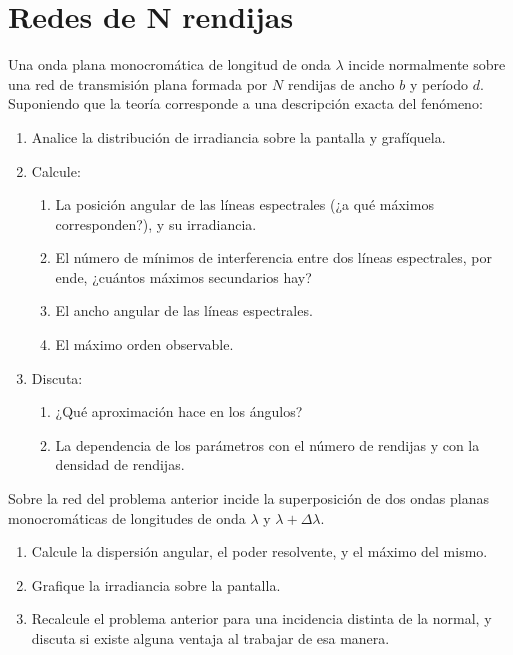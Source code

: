 \section*{Redes de N rendijas}

\item Una onda plana monocromática de longitud de onda $\lambda$ incide normalmente sobre una red de transmisión plana formada por $N$ rendijas de ancho $b$ y período $d$.
Suponiendo que la teoría corresponde a una descripción exacta del fenómeno: 
\begin{enumerate}
	\item Analice la distribución de irradiancia sobre la pantalla y grafíquela.
	\item Calcule:
	\begin{enumerate}
		\item La posición angular de las líneas espectrales (¿a qué máximos corresponden?), y su irradiancia.
		\item El número de mínimos de interferencia entre dos líneas espectrales, por ende, ¿cuántos máximos secundarios hay?
		\item El ancho angular de las líneas espectrales.
		\item El máximo orden observable. 
	\end{enumerate}
	\item Discuta: 
	\begin{enumerate}
		\item ¿Qué aproximación hace en los ángulos?
		\item La dependencia de los parámetros con el número de rendijas y con la densidad de rendijas. 
	\end{enumerate}
\end{enumerate}



\item Sobre la red del problema anterior incide la superposición de dos ondas planas monocromáticas de longitudes de onda $\lambda$ y $\lambda+\Delta\lambda$.
\begin{enumerate}
	\item Calcule la dispersión angular, el poder resolvente, y el máximo del mismo.
	\item Grafique la irradiancia sobre la pantalla. 
	\item Recalcule el problema anterior para una incidencia distinta de la normal, y discuta si existe alguna ventaja al trabajar de esa manera. 
\end{enumerate}



